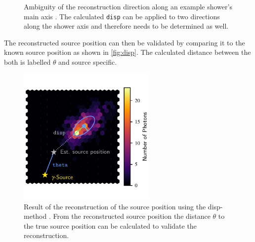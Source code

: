 \begin{figure}
\begin{subfigure}{0.5\textwidth}
  \end{subfigure}
  \caption{Ambiguity of the reconstruction direction along an example shower's main axis \cite{maxhillas}. The calculated \texttt{disp} can be applied to two directions along the shower axis and therefore needs to be determined as well.}
  \label{fig:disp_amb}
\end{figure}
%
The reconstructed source position can then be validated by comparing it to the
known source position as shown in \autoref{fig:disp}. The calculated distance
between the both is labelled $\theta$ and source specific.
%
\begin{figure}
  \centering%
  \includegraphics[width=0.6\textwidth]{Plots/hillas_disp.pdf}%
  \caption{Result of the reconstruction of the source position using the disp-method \cite{maxhillas}. From the reconstructed source position the distance $\theta$ to the true source position can be calculated to validate the reconstruction.}%
  \label{fig:disp}%
\end{figure}
%
